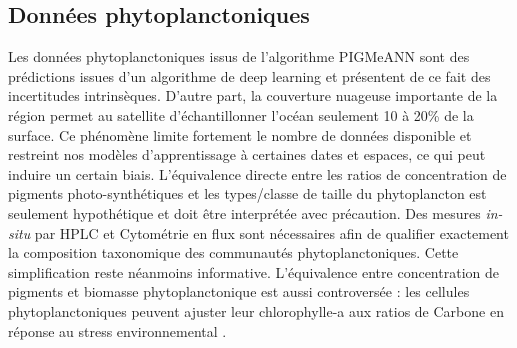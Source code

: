 \documentclass[11pt,a4paper,oneside]{report}
\begin{document}
	\subsection{Données phytoplanctoniques}
	Les données phytoplanctoniques issus de l'algorithme PIGMeANN sont des prédictions issues d'un algorithme de deep learning et présentent de ce fait des incertitudes intrinsèques. D'autre part, la couverture nuageuse importante de la région permet au satellite d'échantillonner l'océan seulement 10 à 20\% de la surface. Ce phénomène limite fortement le nombre de données disponible et restreint nos modèles d'apprentissage à certaines dates et espaces, ce qui peut induire un certain biais. 
	L'équivalence directe entre les ratios de concentration de pigments photo-synthétiques et les types/classe de taille du phytoplancton est seulement hypothétique et doit être interprétée avec précaution. Des mesures \textit{in-situ} par HPLC et Cytométrie en flux sont nécessaires afin de qualifier exactement la composition taxonomique des communautés phytoplanctoniques. Cette simplification reste néanmoins informative. L'équivalence entre concentration de pigments et biomasse phytoplanctonique est aussi controversée : les cellules phytoplanctoniques peuvent ajuster leur chlorophylle-a aux ratios de Carbone en réponse au stress environnemental \cite{thomalla2023Widespread}. 
	
\end{document}
